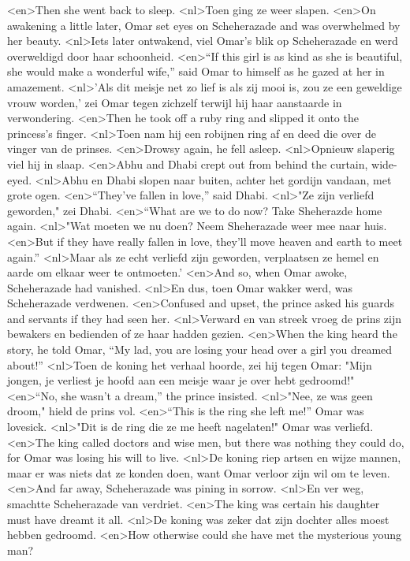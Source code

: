 <en>Then she went back to sleep.
<nl>Toen ging ze weer slapen.
<en>On awakening a little later, Omar set eyes on Scheherazade and was overwhelmed by her beauty.
<nl>Iets later ontwakend, viel Omar's blik op Scheherazade en werd overweldigd door haar schoonheid.
<en>“If this girl is as kind as she is beautiful, she would make a wonderful wife,” said Omar to himself as he gazed at her in amazement.
<nl>'Als dit meisje net zo lief is als zij mooi is, zou ze een geweldige vrouw worden,' zei Omar tegen zichzelf terwijl hij haar aanstaarde in verwondering.
<en>Then he took off a ruby ring and slipped it onto the princess’s finger.
<nl>Toen nam hij een robijnen ring af en deed die over de vinger van de prinses.
<en>Drowsy again, he fell asleep.
<nl>Opnieuw slaperig viel hij in slaap.
<en>Abhu and Dhabi crept out from behind the curtain, wide-eyed.
<nl>Abhu en Dhabi slopen naar buiten, achter het gordijn vandaan, met grote ogen.
<en>“They’ve fallen in love,” said Dhabi.
<nl>"Ze zijn verliefd geworden," zei Dhabi.
<en>“What are we to do now? Take Sheherazde home again.
<nl>"Wat moeten we nu doen? Neem Sheherazade weer mee naar huis.
<en>But if they have really fallen in love, they’ll move heaven and earth to meet again.”
<nl>Maar als ze echt verliefd zijn geworden, verplaatsen ze hemel en aarde om elkaar weer te ontmoeten.'
<en>And so, when Omar awoke, Scheherazade had vanished.
<nl>En dus, toen Omar wakker werd, was Scheherazade verdwenen.
<en>Confused and upset, the prince asked his guards and servants if they had seen her.
<nl>Verward en van streek vroeg de prins zijn bewakers en bedienden of ze haar hadden gezien.
<en>When the king heard the story, he told Omar, “My lad, you are losing your head over a girl you dreamed about!”
<nl>Toen de koning het verhaal hoorde, zei hij tegen Omar: "Mijn jongen, je verliest je hoofd aan een meisje waar je over hebt gedroomd!"
<en>“No, she wasn’t a dream,” the prince insisted.
<nl>"Nee, ze was geen droom," hield de prins vol.
<en>“This is the ring she left me!” Omar was lovesick.
<nl>"Dit is de ring die ze me heeft nagelaten!" Omar was verliefd.
<en>The king called doctors and wise men, but there was nothing they could do, for Omar was losing his will to live.
<nl>De koning riep artsen en wijze mannen, maar er was niets dat ze konden doen, want Omar verloor zijn wil om te leven.
<en>And far away, Scheherazade was pining in sorrow.
<nl>En ver weg, smachtte Scheherazade van verdriet.
<en>The king was certain his daughter must have dreamt it all.
<nl>De koning was  zeker dat zijn dochter alles moest hebben gedroomd.
<en>How otherwise could she have met the mysterious young man?
